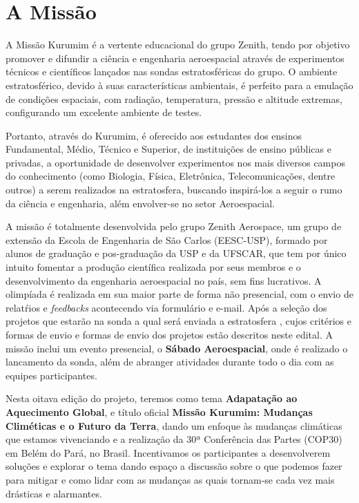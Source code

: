 \section{A Missão} 
    \par A Missão Kurumim é a vertente educacional do grupo Zenith, tendo por objetivo promover e difundir a ciência e engenharia aeroespacial através de experimentos técnicos e científicos lançados nas sondas estratosféricas do grupo. O ambiente estratosférico, devido à suas características ambientais, é perfeito para a emulação de condições espaciais, com radiação, temperatura, pressão e altitude extremas, configurando um excelente ambiente de testes.
    
    \par Portanto, através do Kurumim, é oferecido aos estudantes dos ensinos Fundamental, Médio, Técnico e Superior, de instituições de ensino públicas e privadas, a oportunidade de desenvolver experimentos nos mais diversos campos do conhecimento (como Biologia, Física, Eletrônica, Telecomunicações, dentre outros) a serem realizados na estratosfera, buscando inspirá-los a seguir o rumo da ciência e engenharia, além envolver-se no setor Aeroespacial.
    
    \par A missão é totalmente desenvolvida pelo grupo Zenith Aerospace, um grupo de extensão da 
    Escola de Engenharia de São Carlos (EESC-USP), formado por alunos de graduação e pos-graduação da USP
    e da UFSCAR, que tem por único intuito fomentar a produção científica realizada por seus membros e o 
    desenvolvimento da engenharia aeroespacial no país, sem fins lucrativos. 
    A olimpíada é realizada em sua maior parte de forma não presencial, com o envio de relatŕios e \emph{feedbacks}
    acontecendo via formulário e e-mail. Após a seleção dos projetos que estarão na sonda a qual será enviada a estratosfera
    , cujos critérios e formas de envio e formas de envio dos projetos estão descritos neste edital. A missão
    inclui um evento presencial, o \textbf{Sábado Aeroespacial}, onde é realizado o lancamento da sonda, além
    de abranger atividades durante todo o dia com as equipes participantes.
    
    \par Nesta oitava edição do projeto, teremos como tema \textbf{Adapatação ao Aquecimento Global}, 
    e título oficial \textbf{Missão Kurumim: Mudanças Climéticas e o Futuro da Terra}, dando um enfoque
    às mudanças climáticas que estamos vivenciando e a realização da 30ª Conferência das Partes (COP30) em Belém do Pará, no Brasil.
    Incentivamos os participantes a desenvolverem soluções e explorar o tema dando espaço a discussão sobre
    o que podemos fazer para mitigar e como lidar com as mudanças as quais tornam-se cada vez mais drásticas
    e alarmantes.
    
